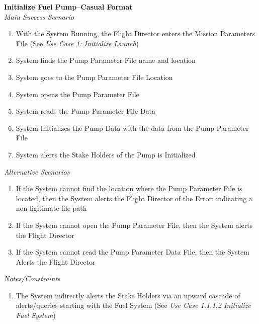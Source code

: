 \documentclass[letterpaper]{article}
\begin{document}
\noindent
\textbf{Initialize Fuel Pump--Casual Format}\\
\textit{Main Success Scenario}
\begin{enumerate}
   \item With the System Running, the Flight Director enters the
      Mission Parameters File (See 
      \textit{Use Case 1:  Initialize Launch})
   \item System finds the Pump Parameter File name and location
   \item System goes to the Pump Parameter File Location
   \item System opens the Pump Parameter File
   \item System reads the Pump Parameter File Data
   \item System Initializes the Pump Data with the data from the Pump
      Parameter File
   \item System alerts the Stake Holders of the Pump is Initialized
\end{enumerate}
\textit{Alternative Scenarios}
\begin{enumerate}
   \item[2a, 3a]If the System cannot find the location where the 
      Pump Parameter File is located, then the System alerts the 
      Flight Director of the Error:  indicating a non-ligitimate file
      path
   \item[4a]If the System cannot open the Pump Parameter File, then
      the System alerts the Flight Director
   \item[5a]If the System cannot read the Pump Parameter Data File, 
      then the System Alerts the Flight Director
\end{enumerate}
\textit{Notes/Constraints}
\begin{enumerate}
   \item[7a]The System indirectly alerts the Stake Holders via an 
      upward cascade of alerts/queries starting with the Fuel System
      (See \textit{Use Case 1.1.1.2 Initialize Fuel System})
\end{enumerate}
\end{document}
